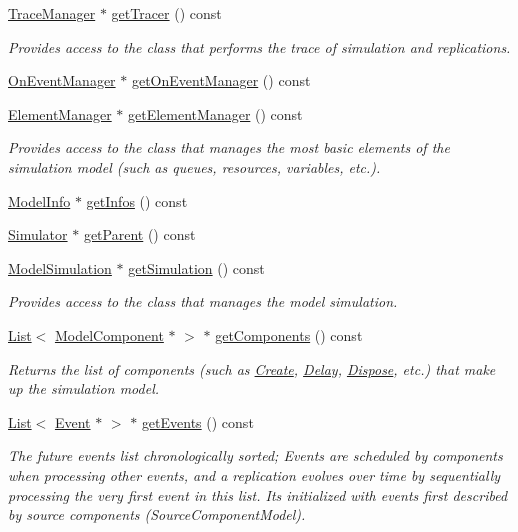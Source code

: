 \begin{DoxyCompactItemize}
\hyperlink{class_trace_manager}{Trace\+Manager} $\ast$ \hyperlink{class_model_adc0de22631d77864b7956591c39ebc60}{get\+Tracer} () const 
\begin{DoxyCompactList}\small\item\em Provides access to the class that performs the trace of simulation and replications. \end{DoxyCompactList}\item 
\hyperlink{class_on_event_manager}{On\+Event\+Manager} $\ast$ \hyperlink{class_model_afc9de1c6025e8332830b29958ede63a2}{get\+On\+Event\+Manager} () const 
\item 
\hyperlink{class_element_manager}{Element\+Manager} $\ast$ \hyperlink{class_model_a46d3fd0cd25e58a294f3feab5347ade7}{get\+Element\+Manager} () const 
\begin{DoxyCompactList}\small\item\em Provides access to the class that manages the most basic elements of the simulation model (such as queues, resources, variables, etc.). \end{DoxyCompactList}\item 
\hyperlink{class_model_info}{Model\+Info} $\ast$ \hyperlink{class_model_ac0f1ea5fbbeba7a2992ee13516e7522f}{get\+Infos} () const 
\item 
\hyperlink{class_simulator}{Simulator} $\ast$ \hyperlink{class_model_a69ed4849ae7708a83ace16abb7251b20}{get\+Parent} () const 
\item 
\hyperlink{class_model_simulation}{Model\+Simulation} $\ast$ \hyperlink{class_model_a217487c8193eb6c0afd95a9315cd51bb}{get\+Simulation} () const 
\begin{DoxyCompactList}\small\item\em Provides access to the class that manages the model simulation. \end{DoxyCompactList}\item 
\hyperlink{class_list}{List}$<$ \hyperlink{class_model_component}{Model\+Component} $\ast$ $>$ $\ast$ \hyperlink{class_model_ae5773d78fc47cb35be7fbeb74b7d63e4}{get\+Components} () const 
\begin{DoxyCompactList}\small\item\em Returns the list of components (such as \hyperlink{class_create}{Create}, \hyperlink{class_delay}{Delay}, \hyperlink{class_dispose}{Dispose}, etc.) that make up the simulation model. \end{DoxyCompactList}\item 
\hyperlink{class_list}{List}$<$ \hyperlink{class_event}{Event} $\ast$ $>$ $\ast$ \hyperlink{class_model_a841c78bda0eb27c652c6921094dc5921}{get\+Events} () const 
\begin{DoxyCompactList}\small\item\em The future events list chronologically sorted; Events are scheduled by components when processing other events, and a replication evolves over time by sequentially processing the very first event in this list. It\textquotesingle{}s initialized with events first described by source components (Source\+Component\+Model). \end{DoxyCompactList}\end{DoxyCompactItemize}


